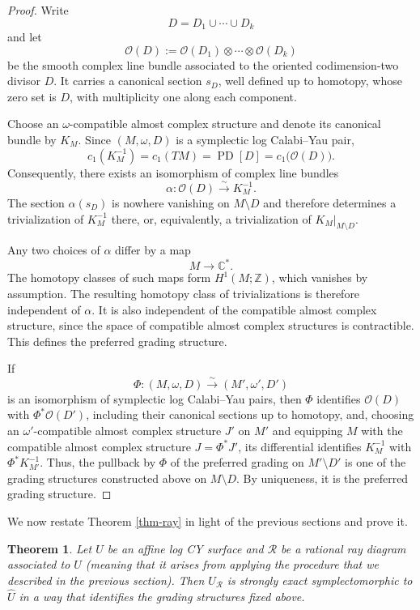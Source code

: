 \documentclass[11pt, reqno]{amsart}
\newtheorem{theorem}{Theorem}[section]
\theoremstyle{definition}
\begin{document}
\begin{proof}
Write
\[
D=D_1\cup\cdots\cup D_k
\]
and let
\[
\mathcal O(D):=
\mathcal O(D_1)\otimes\cdots\otimes\mathcal O(D_k)
\]
be the smooth complex line bundle associated to the oriented
codimension-two divisor $D$. It carries a canonical section $s_D$,
well defined up to homotopy, whose zero set is $D$, with multiplicity
one along each component.

Choose an $\omega$-compatible almost complex structure and denote its
canonical bundle by $K_M$. Since $(M,\omega,D)$ is a symplectic log
Calabi--Yau pair,
\[
c_1(K_M^{-1})=c_1(TM)=\operatorname{PD}[D]
=c_1\bigl(\mathcal O(D)\bigr).
\]
Consequently, there exists an isomorphism of complex line bundles
\[
\alpha\colon\mathcal O(D)\xrightarrow{\sim}K_M^{-1}.
\]
The section $\alpha(s_D)$ is nowhere vanishing on $M\setminus D$ and
therefore determines a trivialization of $K_M^{-1}$ there, or,
equivalently, a trivialization of $K_M|_{M\setminus D}$.

Any two choices of $\alpha$ differ by a map
\[
M\longrightarrow\mathbb C^*.
\]
The homotopy classes of such maps form $H^1(M;\mathbb Z)$, which
vanishes by assumption. The resulting homotopy class of
trivializations is therefore independent of $\alpha$. It is also
independent of the compatible almost complex structure, since the
space of compatible almost complex structures is contractible. This
defines the preferred grading structure.

If
\[
\Phi\colon(M,\omega,D)\xrightarrow{\sim}
(M',\omega',D')
\]
is an isomorphism of symplectic log Calabi--Yau pairs, then $\Phi$
identifies $\mathcal O(D)$ with $\Phi^*\mathcal O(D')$, including
their canonical sections up to homotopy, and, choosing an $\omega'$-compatible almost complex structure $J'$ on $M'$
and equipping $M$ with the compatible almost complex structure
$J=\Phi^*J'$, its differential
identifies $K_M^{-1}$ with $\Phi^*K_{M'}^{-1}$. Thus, the pullback by
$\Phi$ of the preferred grading on $M'\setminus D'$ is one of the
grading structures constructed above on $M\setminus D$. By uniqueness,
it is the preferred grading structure.
\end{proof}

We now restate Theorem \ref{thm-ray} in light of the previous sections and prove it.

\begin{theorem} Let $U$ be an affine log CY surface and $\mathcal{R}$ be a rational ray diagram associated to $U$ (meaning that it arises from applying the procedure that we described in the previous section). Then $U_\mathcal{R}$ is strongly exact symplectomorphic to $\widehat{U}$ in a way that identifies the grading structures fixed above.
\end{theorem}
\end{document}
